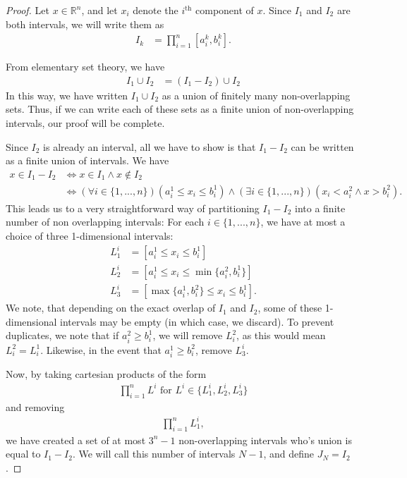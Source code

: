 \documentclass[10pt,a4paper]{article}
\theoremstyle{theorem}
\theoremstyle{definition}
\begin{document}
\begin{proof}
Let $x \in \mathbb{R}^n$, and let $x_i$ denote the $i^\text{th}$ component of $x$.  Since $I_1$ and $I_2$ are both intervals, we will write them as
\begin{align*}
I_k &= \prod_{i = 1}^n [a^k_i , b^k_i].
\end{align*} 

From elementary set theory, we have 
\begin{align*}
I_1\cup I_2 &=  (I_1  - I_2) \cup I_2
\end{align*}
In this way, we have written $I_1\cup I_2$ as a union of finitely many non-overlapping sets. Thus, if we can write each of these sets as a finite union of non-overlapping intervals, our proof will be complete. 

Since $I_2$ is already an interval,  all we have to show is that $I_1 - I_2$ can be written as a finite union of intervals. We have
\begin{align*}
x \in I_1 - I_2 &\iff x \in I_1 \land x \not \in I_2\\
&\iff (\forall i \in \{1,...,n\})(a^1_i \leq x_i \leq b^1_i) \land (\exists i \in \{1,...,n\})(x_i < a^2_i  \land x > b^2_i).
\end{align*}
This leads us to a very straightforward way of partitioning $I_1 - I_2$ into a finite number of non overlapping intervals: For each $i \in \{1,...,n\}$, we have at most a choice of three 1-dimensional intervals: 
\begin{align*}
L^i_1 &= [a_i^1 \leq x_i \leq b_i^1]\\
L^i_2 &= [a_i^1 \leq x_i \leq \min \{a_i^2, b_i^1\}]\\
L^i_3 &= [\max\{a_i^1, b_i^2\} \leq x_i \leq b_i^1].
\end{align*}
We note, that depending on the exact overlap of $I_1$ and $I_2$, some of these 1-dimensional intervals may be empty (in which case, we discard). To prevent duplicates, we note that if $a_i^2 \geq b_i^1$, we will remove $L_i^2$, as this would mean $L_i^2 = L_i^1$. Likewise, in the event that $a_i^1 \geq b_i^2$,  remove $L^i_3$. 

Now, by taking cartesian products of the form
\begin{align*}
\prod_{i=1}^n L^i \text{ for } L^i \in \{L^i_1, L^i_2, L^i_3\}
\end{align*}
and removing 
\begin{align*}
\prod_{i=1}^n L^i_1,
\end{align*}
we have created a set of at most $3^n - 1$ non-overlapping intervals who's union is equal to $I_1  - I_2$.  We will call this number of intervals $N-1$, and define $J_N = I_2$.


\end{proof}
\end{document}
